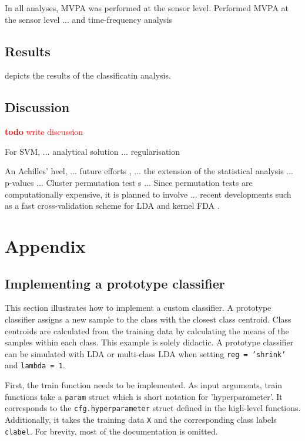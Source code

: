 \documentclass[utf8]{frontiersSCNS} %
\newcommand{\ttt}[1]{\texttt{#1}}
\newcommand{\todo}[1]{\textcolor{red}{\textbf{todo} #1}}
\begin{document}
In all analyses, MVPA was performed at the sensor level. Performed MVPA at the sensor level ... and time-frequency analysis


\subsection{Results}

 depicts the results of the classificatin analysis. 

\subsection{Discussion}


\todo{write discussion}

For SVM, ... analytical solution ... regularisation \citep{Hastie2004TheMachine}


An Achilles' heel, ... future efforts , ... the extension of the statistical analysis ... p-values ... Cluster permutation test s ... Since permutation tests are computationally expensive, it is planned to involve ... recent developments such as a fast cross-validation scheme for LDA and kernel FDA \citep{Treder2019DirectFDA}.

\section{Appendix}

\subsection{Implementing a prototype classifier}

This section illustrates how to implement a custom classifier. A prototype classifier assigns a new sample to the class with the closest class centroid. Class centroids are calculated from the training data by calculating the means of the samples within each class. This example is solely didactic. A prototype classifier can be simulated with LDA or multi-class LDA when setting \ttt{reg = 'shrink'} and \ttt{lambda = 1}.

First, the train function needs to be implemented. As input arguments, train functions take a \ttt{param} struct which is short notation for 'hyperparameter'. It corresponds to the \ttt{cfg.hyperparameter} struct defined in the high-level functions. Additionally, it takes the training data \ttt{X} and the corresponding class labels \ttt{clabel}. For brevity, most of the documentation is omitted.
\end{document}

